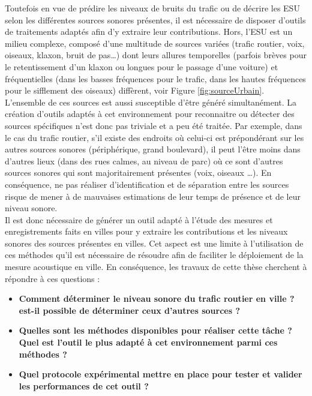 Toutefois en vue de prédire les niveaux de bruits du trafic ou de décrire les ESU selon les différentes sources sonores présentes, il est nécessaire de disposer d'outils de traitements  adaptés afin d'y extraire leur contributions. Hors, l'ESU est un milieu complexe, composé d'une multitude de sources variées (trafic routier, voix, oiseaux, klaxon, bruit de pas\dots) dont leurs allures temporelles (parfois brèves pour le retentissement d'un klaxon ou longues pour le passage d'une voiture) et fréquentielles (dans les basses fréquences pour le trafic, dans les hautes fréquences pour le sifflement des oiseaux) diffèrent, voir Figure \ref{fig:sourceUrbain}.
L'ensemble de ces sources est aussi susceptible d'être généré simultanément. La création d'outils adaptés à cet environnement pour reconnaitre ou détecter des sources spécifiques n'est donc pas triviale et a peu été traitée. Par exemple, dans le cas du trafic routier, s'il existe des endroits où celui-ci est prépondérant sur les autres sources sonores (périphérique, grand boulevard), il peut l'être moins dans d'autres lieux (dans des rues calmes, au niveau de parc) où ce sont d'autres sources sonores qui sont majoritairement présentes (voix, oiseaux \dots). En conséquence, ne pas réaliser d'identification et de séparation  entre les sources risque de mener à de mauvaises estimations de leur temps de présence et de leur niveau sonore. \\

Il est donc nécessaire de générer un outil adapté à l'étude des mesures et enregistrements faits en villes pour y extraire les contributions et les niveaux sonores des sources présentes en villes. Cet aspect est une limite à l'utilisation de ces méthodes qu'il est nécessaire de résoudre afin de faciliter le déploiement de la mesure acoustique en ville.
En conséquence, les travaux de cette thèse cherchent à répondre à ces questions :

\begin{itemize}
\item \textbf{Comment déterminer le niveau sonore du trafic routier en ville ? est-il possible de déterminer ceux d'autres sources ?}
\item \textbf{Quelles sont les méthodes disponibles pour réaliser cette tâche ? Quel est l'outil le plus adapté à cet environnement parmi ces méthodes ?}
\item \textbf{Quel protocole expérimental mettre en place pour tester et valider les performances de cet outil ?}
\end{itemize}


